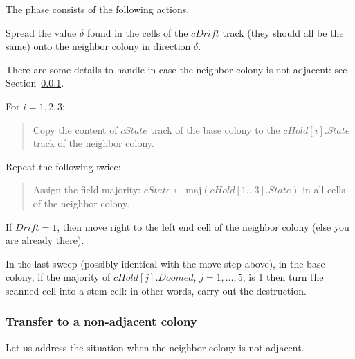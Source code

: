 \documentclass[12pt]{memoir}
\newcommand{\fld}[1]{\ensuremath{\textit{#1}}}
\newcommand{\maj}{\mathrm{maj}}
\newcommand{\Drift}{\fld{Drift}}
\newcommand{\Doomed}{\fld{Doomed}}
\newcommand{\cDrift}{\fld{cDrift}}
\newcommand{\cHold}{\fld{cHold}}
\newcommand{\State}{\fld{State}}
\newcommand{\cState}{\fld{cState}}
\begin{document}
The phase consists of the following actions.
\begin{enumerate}[1.]
\item
  Spread the value \( \delta \) found in the cells of the \( \cDrift \) track
  (they should all be the same)
  onto the neighbor colony in direction \( \delta \).

There are some details to handle in case the neighbor colony is not adjacent:
see Section~\ref{sec:adjacency}.

\item\label{i:transfer-state} For \( i=1,2,3 \):
        \begin{quote}
          Copy the content of \( \cState \) track of the base colony
            to the \( \cHold[i].\State \) track of the neighbor colony.
        \end{quote}

\item Repeat the following twice:
  \begin{quote}
 Assign the field majority: \( \cState\gets \maj(\cHold[1 \dots  3].\State) \)
in all cells of the neighbor colony.    
  \end{quote}
  
\item If \( \Drift = 1 \), then move right to the left end cell of the neighbor colony
(else you are already there).

        \begin{sloppypar}
          \item In the last sweep (possibly identical with the move step above), 
            in the base colony, if the majority of \( \cHold[j].\Doomed \), \( j=1,\dots,5 \), 
            is 1 then turn the scanned cell into a stem cell: 
            in other words, carry out the destruction.
          \end{sloppypar}


\end{enumerate}

\subsubsection{Transfer to a non-adjacent colony}\label{sec:adjacency}

Let us address the situation when the neighbor colony is not adjacent.
\end{document}
